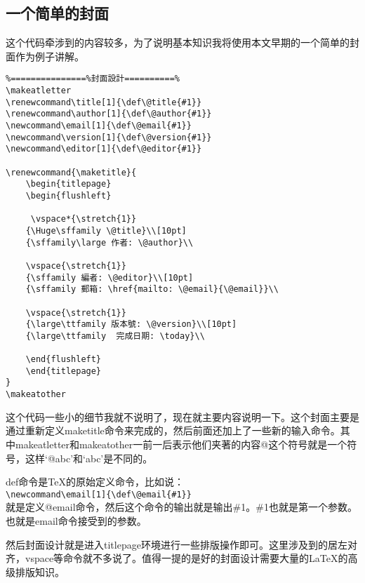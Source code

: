 \subsection{一个简单的封面}
这个代码牵涉到的内容较多，为了说明基本知识我将使用本文早期的一个简单的封面作为例子讲解。
\begin{verbatim}
%===============%封面設計==========%
\makeatletter
\renewcommand\title[1]{\def\@title{#1}}
\renewcommand\author[1]{\def\@author{#1}}
\newcommand\email[1]{\def\@email{#1}}
\newcommand\version[1]{\def\@version{#1}}
\newcommand\editor[1]{\def\@editor{#1}}

\renewcommand{\maketitle}{
	\begin{titlepage}
	\begin{flushleft}
	
	 \vspace*{\stretch{1}}
    {\Huge\sffamily \@title}\\[10pt]
    {\sffamily\large 作者: \@author}\\
    	
	\vspace{\stretch{1}}
	{\sffamily 編者: \@editor}\\[10pt]
	{\sffamily 郵箱: \href{mailto: \@email}{\@email}}\\
	
	\vspace{\stretch{1}}
	{\large\ttfamily 版本號: \@version}\\[10pt]
	{\large\ttfamily  完成日期: \today}\\
	
	\end{flushleft}
	\end{titlepage}
}
\makeatother
\end{verbatim}
这个代码一些小的细节我就不说明了，现在就主要内容说明一下。这个封面主要是通过重新定义maketitle命令来完成的，然后前面还加上了一些新的输入命令。其中makeatletter和makeatother一前一后表示他们夹著的内容@这个符号就是一个符号，这样‘@abc’和‘abc’是不同的。

def命令是\TeX 的原始定义命令，比如说：\\
\verb+\newcommand\email[1]{\def\@email{#1}}+\\
就是定义@email命令，然后这个命令的输出就是输出\#{}1。\#{}1也就是第一个参数。也就是email命令接受到的参数。

然后封面设计就是进入titlepage环境进行一些排版操作即可。这里涉及到的居左对齐，vspace等命令就不多说了。值得一提的是好的封面设计需要大量的\LaTeX 的高级排版知识。


